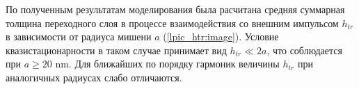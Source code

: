 
По полученным результатам моделирования была расчитана средняя суммарная толщина переходного слоя в процессе взаимодействия со внешним импульсом $h_{tr}$ в зависимости от радиуса мишени $a$ (\autoref{lpic_htr:image}). Условие квазистационарности в таком случае принимает вид $h_{tr} \ll 2a$, что соблюдается при $a \geq 20$ nm. Для ближайших по порядку гармоник величины $h_{tr}$ при аналогичных радиусах слабо отличаются.
